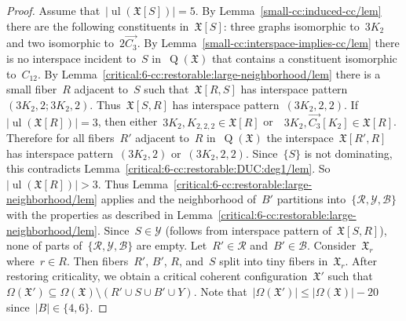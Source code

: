 \documentclass[english,a4paper]{article}
\theoremstyle{plain}
\theoremstyle{definition}
\newcommand{\abs}[1]{| #1 |}
\newcommand{\coherentConfig}{\ensuremath{\mathfrak{X}}}
\newcommand{\interspace}[2]{\ensuremath{\coherentConfig[#1,#2]}}
\newcommand{\inducedCC}[1]{\ensuremath{\coherentConfig[#1]}}
\DeclareMathOperator*{\ul}{ul}
\newcommand{\vertices}{\ensuremath{\Omega}}
\DeclareMathOperator*{\Quotient}{Q}
\newcommand{\quotientGraph}[1]{\ensuremath{\Quotient(#1)}}
\newcommand{\ipsixMatching}             {\ensuremath{(\disjointCliques{3}{2},2)}}
\newcommand{\ipsixMatchingTwice}        {\ensuremath{(\disjointCliques{3}{2},2,2)}}
\newcommand{\ipsixMatchingMatching}     {\ensuremath{(\disjointCliques{3}{2},2;\disjointCliques{3}{2},2)}}
\newcommand{\clique}[1]{\ensuremath{K_{#1}}}
\newcommand{\cycle}[1]{\ensuremath{C_{#1}}}
\newcommand{\disjointCliques}[2]{\ensuremath{#1 \clique{#2}}}
\begin{document}
\begin{proof}
    Assume that~$\abs{\ul(\inducedCC{S})} = 5$.
    By Lemma~\ref{small-cc:induced-cc/lem} there are the following constituents in~$\inducedCC{S}$: three graphs isomorphic to~$\disjointCliques{3}{2}$ and two isomorphic to~$2\overrightarrow{C_3}$.
    By Lemma~\ref{small-cc:interspace-implies-cc/lem} there is no interspace incident to~$S$ in~$\quotientGraph{\coherentConfig}$ that contains a constituent isomorphic to~$\cycle{12}$.
    By Lemma~\ref{critical:6-cc:restorable:large-neighborhood/lem} there is a small fiber~$R$ adjacent to~$S$ such that~$\interspace{R}{S}$ has interspace pattern~$\ipsixMatchingMatching$.
    Thus~$\interspace{S}{R}$ has interspace pattern~$\ipsixMatchingTwice$.
    If~$|\ul(\inducedCC{R})| = 3$, then either~$\disjointCliques{3}{2},\clique{2,2,2} \in \inducedCC{R}$ or~~$\disjointCliques{3}{2},\overrightarrow{C_3}[K_2] \in \inducedCC{R}$.
    Therefore for all fibers~$R'$ adjacent to~$R$ in~$\quotientGraph{\coherentConfig}$ the interspace~$\interspace{R'}{R}$ has interspace pattern~$\ipsixMatching$ or~$\ipsixMatchingTwice$.
    Since~$\{S\}$ is not dominating, this contradicts Lemma~\ref{critical:6-cc:restorable:DUC:deg1/lem}.
    So~$|\ul(\inducedCC{R})| > 3$.
    Thus Lemma~\ref{critical:6-cc:restorable:large-neighborhood/lem} applies and the neighborhood of~$B'$ partitions into~$\{\mathcal{R},\mathcal{Y},\mathcal{B}\}$ with the properties as described in Lemma~\ref{critical:6-cc:restorable:large-neighborhood/lem}.
    Since~$S \in \mathcal{Y}$ (follows from interspace pattern of~$\interspace{S}{R}$), none of parts of~$\{\mathcal{R},\mathcal{Y},\mathcal{B}\}$ are empty.
    Let~$R' \in \mathcal{R}$ and~$B' \in \mathcal{B}$.
    Consider~$\coherentConfig_r$ where~$r \in R$.
    Then fibers~$R'$, $B'$, $R$, and~$S$ split into tiny fibers in~$\coherentConfig_r$.
    After restoring criticality, we obtain a critical coherent configuration~$\coherentConfig'$ such that~$\vertices(\coherentConfig') \subseteq \vertices(\coherentConfig) \setminus (R' \cup S \cup B' \cup Y)$.
    Note that~$\abs{\vertices(\coherentConfig')} \leq \abs{\vertices(\coherentConfig)} - 20$ since~$\abs{B} \in \{4,6\}$.


\end{proof}
\end{document}
